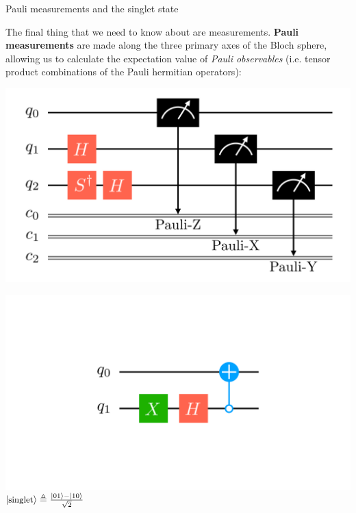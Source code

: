 \documentclass[9pt, handout, aspectratio=169]{beamer}	%
\begin{document}

\begin{frame}{Pauli measurements and the singlet state}

	The final thing that we need to know about are measurements. \textbf{Pauli measurements} are made along the three primary axes of the Bloch sphere, allowing us to calculate the expectation value of \emph{Pauli observables} (i.e. tensor product combinations of the Pauli hermitian operators):

	\begin{multicols}{2}

		\begin{center}
			\includegraphics[width=.40\paperwidth]{Figures/quantum-background/circuit-gates-pauli}
		\end{center}

		\columnbreak

		\pause
		\begin{center}
			\includegraphics[width=.40\paperwidth]{Figures/quantum-background/circuit-gates-singlet}\\ \vspace{-2em}
			$\ket{\text{\small singlet}} \triangleq \frac{\ket{01}-\ket{10}}{\sqrt{2}}$
		\end{center}

	\end{multicols}

\end{frame}
\end{document}
